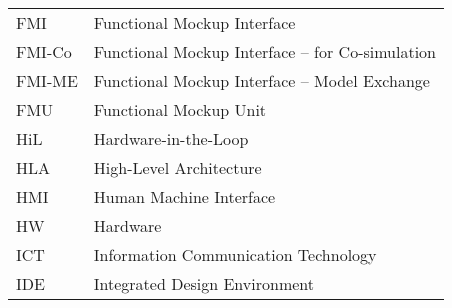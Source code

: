 \begin{longtable}{ll}
FMI     &Functional Mockup Interface\\
FMI-Co  &Functional Mockup Interface -- for Co-simulation\\
FMI-ME  &Functional Mockup Interface -- Model Exchange\\
FMU     &Functional Mockup Unit\\
HiL	&Hardware-in-the-Loop\\
HLA & High-Level Architecture \\
HMI     &Human Machine Interface\\
HW      &Hardware\\
ICT	&Information Communication Technology\\
IDE	&Integrated Design Environment\\

\end{longtable}
